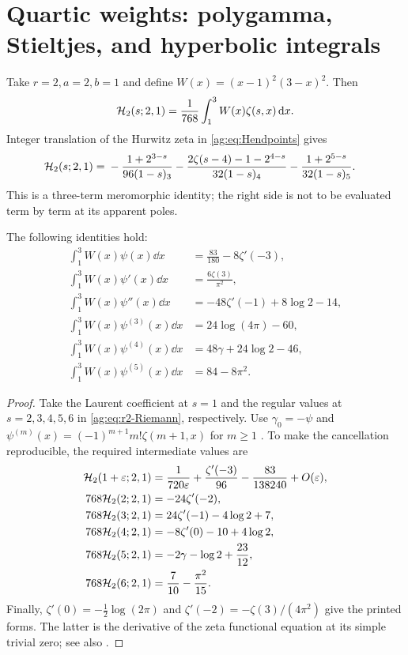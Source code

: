 \section{Quartic weights: polygamma, Stieltjes, and hyperbolic integrals}
\label{ag:sec:examples}

Take $r=2,a=2,b=1$ and define $W(x)=(x-1)^2(3-x)^2$. Then
\begin{equation}\label{ag:eq:r2-compact}
 \mathcal H_2(s;2,1)=\frac1{768}\int_1^3W(x)\zeta(s,x)\,\mathrm d x.
\end{equation}
Integer translation of the Hurwitz zeta in
\eqref{ag:eq:Hendpoints} gives
\begin{align}
 \mathcal H_2(s;2,1)={}&-\frac{1+2^{3-s}}{96(1-s)_3}
 -\frac{2\zeta(s-4)-1-2^{4-s}}{32(1-s)_4}
 -\frac{1+2^{5-s}}{32(1-s)_5}.
 \label{ag:eq:r2-Riemann}
\end{align}
This is a three-term meromorphic identity; the right side is not to be
evaluated term by term at its apparent poles.

\begin{proposition}
\label{ag:prop:six-integrals}
The following identities hold:
\begin{align}
 \int_1^3W(x)\psi(x)\dd x
   &=\frac{83}{180}-8\zeta'(-3),\label{ag:eq:Ipsi0}\\
 \int_1^3W(x)\psi'(x)\dd x
   &=\frac{6\zeta(3)}{\pi^2},\label{ag:eq:Ipsi1}\\
 \int_1^3W(x)\psi''(x)\dd x
   &=-48\zeta'(-1)+8\log2-14,\label{ag:eq:Ipsi2}\\
 \int_1^3W(x)\psi^{(3)}(x)\dd x
   &=24\log(4\pi)-60,\label{ag:eq:Ipsi3}\\
 \int_1^3W(x)\psi^{(4)}(x)\dd x
   &=48\gamma+24\log2-46,\label{ag:eq:Ipsi4}\\
 \int_1^3W(x)\psi^{(5)}(x)\dd x
   &=84-8\pi^2.\label{ag:eq:Ipsi5}
\end{align}
\end{proposition}
\begin{proof}
Take the Laurent coefficient at $s=1$ and the regular values at
$s=2,3,4,5,6$ in \eqref{ag:eq:r2-Riemann}, respectively. Use
$\gamma_0=-\psi$ and
$\psi^{(m)}(x)=(-1)^{m+1}m!\zeta(m+1,x)$ for $m\ge1$
\cite{DLMFpsi}. To make the cancellation reproducible, the required
intermediate values are
\begin{align*}
 \mathcal H_2(1+\varepsilon;2,1)
 &=\frac1{720\varepsilon}+\frac{\zeta'(-3)}{96}
                               -\frac{83}{138240}+O(\varepsilon),\\
 768\mathcal H_2(2;2,1)&=-24\zeta'(-2),\\
 768\mathcal H_2(3;2,1)&=24\zeta'(-1)-4\log2+7,\\
 768\mathcal H_2(4;2,1)&=-8\zeta'(0)-10+4\log2,\\
 768\mathcal H_2(5;2,1)&=-2\gamma-\log2+\frac{23}{12},\\
 768\mathcal H_2(6;2,1)&=\frac7{10}-\frac{\pi^2}{15}.
\end{align*}
Finally, $\zeta'(0)=-\tfrac12\log(2\pi)$ and
$\zeta'(-2)=-\zeta(3)/(4\pi^2)$ give the printed forms.
The latter is the derivative of the zeta functional equation at its
simple trivial zero; see also \cite{DLMFintegers}.
\end{proof}

